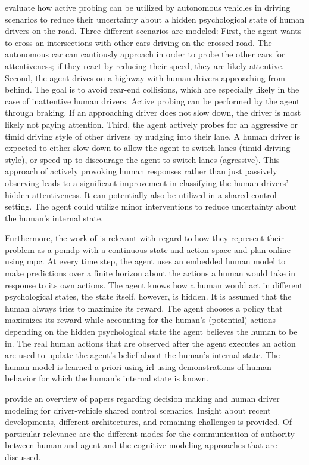 \cite{att_intersec} evaluate how active probing can be utilized by autonomous vehicles in driving scenarios to reduce their uncertainty about a hidden psychological state of human drivers on the road. Three different scenarios are modeled: First, the agent wants to cross an intersections with other cars driving on the crossed road. The autonomous car can cautiously approach in order to probe the other cars for attentiveness; if they react by reducing their speed, they are likely attentive. Second, the agent drives on a highway with human drivers approaching from behind. The goal is to avoid rear-end collisions, which are especially likely in the case of inattentive human drivers. Active probing can be performed by the agent through braking. If an approaching driver does not slow down, the driver is most likely not paying attention. Third, the agent actively probes for an aggressive or timid driving style of other drivers by nudging into their lane. A human driver is expected to either slow down to allow the agent to switch lanes (timid driving style), or speed up to discourage the agent to switch lanes (agressive). This approach of actively provoking human responses rather than just passively observing leads to a significant improvement in classifying the human drivers' hidden attentiveness. It can potentially also be utilized in a shared control setting. The agent could utilize minor interventions to reduce uncertainty about the human's internal state.

Furthermore, the work of \cite{att_intersec} is relevant with regard to how they represent their problem as a \gls{pomdp} with a continuous state and action space and plan online using \gls{mpc}. At every time step, the agent uses an embedded human model to make predictions over a finite horizon about the actions a human would take in response to its own actions. The agent knows how a human would act in different psychological states, the state itself, however, is hidden. It is assumed that the human always tries to maximize its reward. The agent chooses a policy that maximizes its reward while accounting for the human's (potential) actions depending on the hidden psychological state the agent believes the human to be in. The real human actions that are observed after the agent executes an action are used to update the agent's belief about the human's internal state. The human model is learned a priori using \gls{irl} using demonstrations of human behavior for which the human's internal state is known.



\cite{shared_control} provide an overview of papers regarding decision making and human driver modeling for driver-vehicle shared control scenarios. Insight about recent developments, different architectures, and remaining challenges is provided. Of particular relevance are the different modes for the communication of authority between human and agent and the cognitive modeling approaches that are discussed.





